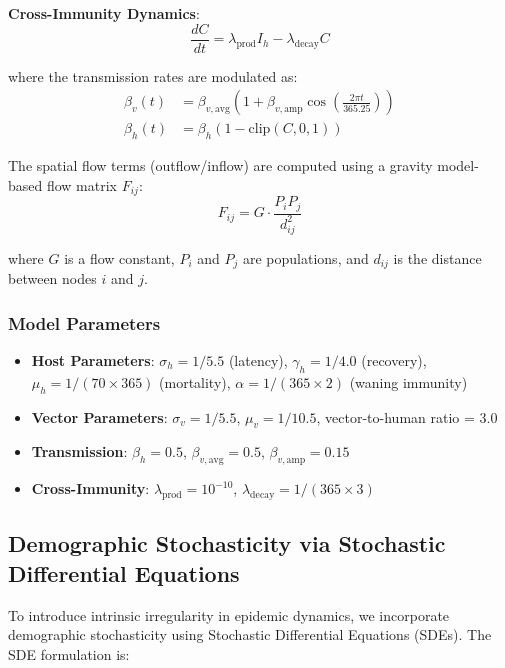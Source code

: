 \documentclass[12pt,a4paper]{article}
\begin{document}
\textbf{Cross-Immunity Dynamics}:
\begin{equation}
\frac{dC}{dt} = \lambda_{\text{prod}} I_h - \lambda_{\text{decay}} C
\end{equation}

where the transmission rates are modulated as:
\begin{align}
\beta_v(t) &= \beta_{v,\text{avg}} \left(1 + \beta_{v,\text{amp}} \cos\left(\frac{2\pi t}{365.25}\right)\right) \\
\beta_h(t) &= \beta_h \left(1 - \text{clip}(C, 0, 1)\right)
\end{align}

The spatial flow terms (outflow/inflow) are computed using a gravity model-based flow matrix $F_{ij}$:
\begin{equation}
F_{ij} = G \cdot \frac{P_i P_j}{d_{ij}^2}
\end{equation}

where $G$ is a flow constant, $P_i$ and $P_j$ are populations, and $d_{ij}$ is the distance between nodes $i$ and $j$.

\subsubsection{Model Parameters}
\begin{itemize}
    \item \textbf{Host Parameters}: $\sigma_h = 1/5.5$ (latency), $\gamma_h = 1/4.0$ (recovery), $\mu_h = 1/(70 \times 365)$ (mortality), $\alpha = 1/(365 \times 2)$ (waning immunity)
    \item \textbf{Vector Parameters}: $\sigma_v = 1/5.5$, $\mu_v = 1/10.5$, vector-to-human ratio = 3.0
    \item \textbf{Transmission}: $\beta_h = 0.5$, $\beta_{v,\text{avg}} = 0.5$, $\beta_{v,\text{amp}} = 0.15$
    \item \textbf{Cross-Immunity}: $\lambda_{\text{prod}} = 10^{-10}$, $\lambda_{\text{decay}} = 1/(365 \times 3)$
\end{itemize}

\subsection{Demographic Stochasticity via Stochastic Differential Equations}

To introduce intrinsic irregularity in epidemic dynamics, we incorporate demographic stochasticity using Stochastic Differential Equations (SDEs). The SDE formulation is:
\end{document}
